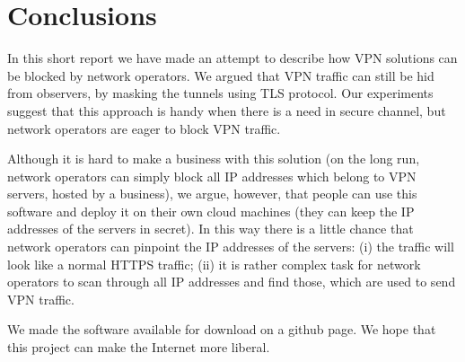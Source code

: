 \section{Conclusions}
\label{section:conclusion}

In this short report we have made an attempt to describe how VPN solutions
can be blocked by network operators. We argued that VPN traffic can still be
hid from observers, by masking the tunnels using TLS protocol. 
Our experiments suggest that this approach is handy when there is a need
in secure channel, but network operators are eager to block VPN traffic.

Although it is hard to make a business with this solution (on the long
run, network operators can simply block all IP addresses which belong to VPN servers,
hosted by a business), we argue, however, that people can use this software
and deploy it on their own cloud machines (they can keep the IP addresses 
of the servers in secret). In this way there is a little chance
that network operators can pinpoint the IP addresses of the servers: (i)
the traffic will look like a normal HTTPS traffic; (ii) it is rather complex task
for network operators to scan through all IP addresses and find those, which 
are used to send VPN traffic.

We made the software available for download on a github page. We hope that 
this project can make the Internet more liberal.
